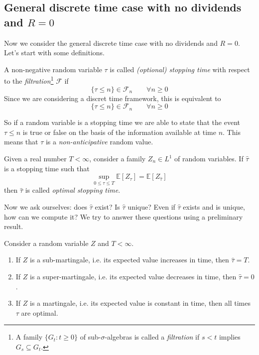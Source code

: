 \subsection{General discrete time case with no dividends and \texorpdfstring{$R=0$}{R=0}}
Now we consider the general discrete time case with no dividends and $R=0$. Let's start with some definitions.
\begin{definition}
A non-negative random variable $\tau$ is called \emph{(optional) stopping time} with respect to the \emph{filtration}\footnote{A family $\{G_t:t\ge0\}$ of sub-$\sigma$-algebras is called a \emph{filtration} if $s < t$ implies $G_s \subseteq G_t$.} $\mathcal{F}$ if
\begin{equation}
    \{\tau \le n\}\in\mathcal{F}_n \qquad\forall n\ge0
\end{equation}
Since we are considering a discret time framework, this is equivalent to
\begin{equation}
    \{\tau \le n\}\in\mathcal{F}_n \qquad\forall n\ge0
\end{equation}
\end{definition}
\noindent So if a random variable is a stopping time we are able to state that the event $\tau\le n$ is true or false on the basis of the information available at time $n$. This means that $\tau$ is a \emph{non-anticipative} random value.
\begin{definition}
Given a real number $T<\infty$, consider a family $Z_n\in L^1$ of random variables. If $\hat{\tau}$ is a stopping time such that
\begin{equation}
    \sup_{0\le\tau\le T}\mathbb{E}[Z_{\tau}] = \mathbb{E} [Z_{\hat{\tau}}]
\end{equation}
then $\hat{\tau}$ is called \emph{optimal stopping time}.
\end{definition}
\noindent Now we ask ourselves: does $\hat{\tau}$ exist? Is $\hat{\tau}$ unique? Even if $\hat{\tau}$ exists and is unique, how can we compute it? We try to answer these questions using a preliminary result.
\begin{proposition}\label{martingales}
Consider a random variable $Z$ and $T<\infty$.
\begin{enumerate}
    \item If $Z$ is a sub-martingale, i.e. its expected value increases in time, then $\hat{\tau}=T$.
    \item If $Z$ is a super-martingale, i.e. its expected value decreases in time, then $\hat{\tau}=0$.
    \item If $Z$ is a martingale, i.e. its expected value is constant in time, then all times $\tau$ are optimal.
\end{enumerate}
\end{proposition}

